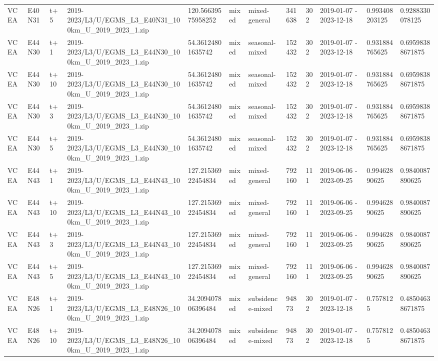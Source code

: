 \begin{landscape}
\begin{longtable}{llllllllllll}
VCEA & E40N31 & t+5 & 2019-2023/L3/U/EGMS\_L3\_E40N31\_100km\_U\_2019\_2023\_1.zip & 120.56639575958252 & mixed & mixed-general & 341638 & 302 & 2019-01-07 - 2023-12-18 & 0.993408203125 & 0.9288330078125 \\
VCEA & E44N30 & t+1 & 2019-2023/L3/U/EGMS\_L3\_E44N30\_100km\_U\_2019\_2023\_1.zip & 54.36124801635742 & mixed & seasonal-mixed & 152432 & 302 & 2019-01-07 - 2023-12-18 & 0.931884765625 & 0.69598388671875 \\
VCEA & E44N30 & t+10 & 2019-2023/L3/U/EGMS\_L3\_E44N30\_100km\_U\_2019\_2023\_1.zip & 54.36124801635742 & mixed & seasonal-mixed & 152432 & 302 & 2019-01-07 - 2023-12-18 & 0.931884765625 & 0.69598388671875 \\
VCEA & E44N30 & t+3 & 2019-2023/L3/U/EGMS\_L3\_E44N30\_100km\_U\_2019\_2023\_1.zip & 54.36124801635742 & mixed & seasonal-mixed & 152432 & 302 & 2019-01-07 - 2023-12-18 & 0.931884765625 & 0.69598388671875 \\
VCEA & E44N30 & t+5 & 2019-2023/L3/U/EGMS\_L3\_E44N30\_100km\_U\_2019\_2023\_1.zip & 54.36124801635742 & mixed & seasonal-mixed & 152432 & 302 & 2019-01-07 - 2023-12-18 & 0.931884765625 & 0.69598388671875 \\
VCEA & E44N43 & t+1 & 2019-2023/L3/U/EGMS\_L3\_E44N43\_100km\_U\_2019\_2023\_1.zip & 127.21536922454834 & mixed & mixed-general & 792160 & 111 & 2019-06-06 - 2023-09-25 & 0.99462890625 & 0.9840087890625 \\
VCEA & E44N43 & t+10 & 2019-2023/L3/U/EGMS\_L3\_E44N43\_100km\_U\_2019\_2023\_1.zip & 127.21536922454834 & mixed & mixed-general & 792160 & 111 & 2019-06-06 - 2023-09-25 & 0.99462890625 & 0.9840087890625 \\
VCEA & E44N43 & t+3 & 2019-2023/L3/U/EGMS\_L3\_E44N43\_100km\_U\_2019\_2023\_1.zip & 127.21536922454834 & mixed & mixed-general & 792160 & 111 & 2019-06-06 - 2023-09-25 & 0.99462890625 & 0.9840087890625 \\
VCEA & E44N43 & t+5 & 2019-2023/L3/U/EGMS\_L3\_E44N43\_100km\_U\_2019\_2023\_1.zip & 127.21536922454834 & mixed & mixed-general & 792160 & 111 & 2019-06-06 - 2023-09-25 & 0.99462890625 & 0.9840087890625 \\
VCEA & E48N26 & t+1 & 2019-2023/L3/U/EGMS\_L3\_E48N26\_100km\_U\_2019\_2023\_1.zip & 34.209407806396484 & mixed & subsidence-mixed & 94873 & 302 & 2019-01-07 - 2023-12-18 & 0.7578125 & 0.48504638671875 \\
VCEA & E48N26 & t+10 & 2019-2023/L3/U/EGMS\_L3\_E48N26\_100km\_U\_2019\_2023\_1.zip & 34.209407806396484 & mixed & subsidence-mixed & 94873 & 302 & 2019-01-07 - 2023-12-18 & 0.7578125 & 0.48504638671875 \\

\end{longtable}
\end{landscape}
